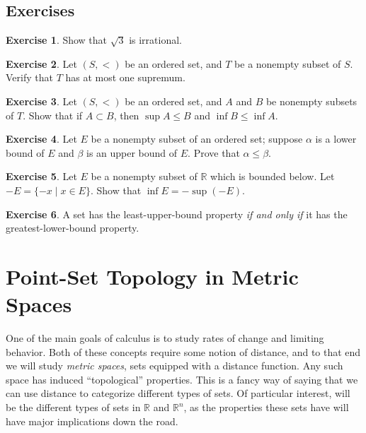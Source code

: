 \documentclass{article}
\newcommand{\R}{\mathbb{R}}
\theoremstyle{definition}
\newtheorem{ex}{Exercise}[section]
\begin{document}
\subsection{Exercises}
\begin{ex}
	Show that $ \sqrt{3} $ is irrational.
\end{ex}
\begin{ex}
	Let $ (S,<) $ be an ordered set, and $ T $ be a nonempty subset of $ S $. Verify that $ T $ has at most one supremum.
\end{ex}
\begin{ex}
	Let $ (S,<) $ be an ordered set,  and $ A $ and $ B $ be nonempty subsets of $ T $. Show that if $ A\subset B $, then $ \sup A\le B $ and $ \inf B\le\inf A $.
\end{ex}
\begin{ex}
	Let $ E $ be a nonempty subset of an ordered set; suppose $ \alpha $ is a lower bound of $ E $ and $ \beta $ is an upper bound of $ E $. Prove that $ \alpha\le\beta $. 
\end{ex}
\begin{ex}
	Let $ E $ be a nonempty subset of $ \R $ which is bounded below. Let $ -E=\{-x\mid x\in E\} $. Show that $ \inf E=-\sup(-E) $. 
\end{ex}
\begin{ex}
	A set has the least-upper-bound property \textit{if and only if} it has the greatest-lower-bound property. 
\end{ex}
\newpage

\section{Point-Set Topology in Metric Spaces}
One of the main goals of calculus is to study rates of change and limiting behavior. Both of these concepts require some notion of distance, and to that end we will study \textit{metric spaces}, sets equipped with a distance function. Any such space has induced ``topological'' properties. This is a fancy way of saying that we can use distance to categorize different types of sets. Of particular interest, will be the different types of sets in $ \R $ and $ \R^n $, as the properties these sets have will have major implications down the road.  
\end{document}
